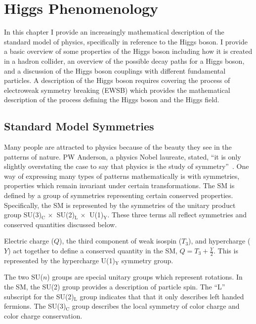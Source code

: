 \chapter{Higgs Phenomenology}
\label{sec:pheno}


In this chapter I provide an increasingly mathematical description of the standard model
of physics, specifically in reference to the Higgs boson. I provide a basic overview of some 
properties of the Higgs boson including how it is created in a hadron collider, an overview
of the possible decay paths for a Higgs boson, and a discussion of the Higgs boson
couplings with different fundamental particles. A description of the
Higgs boson requires covering the process of electroweak symmetry breaking (EWSB) which
provides the mathematical description of the process defining the Higgs boson and the
Higgs field.

\section{Standard Model Symmetries}
Many people are attracted to physics because of the beauty they see in the patterns of nature.
PW Anderson, a physics Nobel laureate, stated, ``it is only slightly overstating the case 
to say that physics is the study of symmetry''~\cite{pw_anderson:1972}.
One way of expressing many types of patterns mathematically is with symmetries, properties which 
remain invariant under certain transformations. The SM is defined by a group of symmetries
representing certain conserved properties. Specifically, the SM is represented by  the
symmetries of the unitary product group SU(3)$_{\text{C}} \,\times \,$ SU(2)$_{\text{L}} \, \times\,$ U(1)$_{\text{Y}}$.
These three terms all reflect symmetries and conserved quantities discussed below.

Electric charge ($Q$), the third component of weak isospin ($T_{3}$), and hypercharge ($Y$) act together to define a conserved 
quantity in the SM, $Q = T_{3} + \frac{Y}{2}$. This is represented by the
hypercharge U(1)$_{\text{Y}}$ symmetry group.

The two SU($n$) groups are special unitary groups which represent rotations.
In the SM, the SU(2) group provides a description of particle spin.
The ``L'' subscript for the SU(2)$_{\text{L}}$ group indicates that that it
only describes left handed fermions.
The SU(3)$_{\text{C}}$ group describes the local symmetry of color charge and
color charge conservation.


